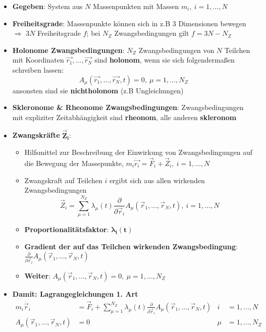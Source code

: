 \begin{itemize}
	\item \textbf{Gegeben}: System aus $N$ Massenpunkten mit Massen $m_i,\ i = 1, \dots, N$
	\item \textbf{Freiheitsgrade}: Massenpunkte können sich in z.B $3$ Dimensionen bewegen $\Rightarrow$ $3N$ Freiheitsgrade $f$; bei $N_Z$ Zwangsbedingungen gilt $f = 3N - N_Z$
	\item \textbf{Holonome Zwangsbedingungen}: $N_Z$ Zwangsbedingungen von $N$ Teilchen mit Koordinaten $\vec{r_1}, \dots, \vec{r_N}$ sind \textbf{holonom}, wenn sie sich folgendermaßen schreiben lassen: $$A_\mu(\vec{r_1}, \dots, \vec{r_N}, t) = 0,\ \mu = 1, \dots, N_Z$$ ansonsten sind sie \textbf{nichtholonom} (z.B Ungleichungen)
	\item \textbf{Skleronome \& Rheonome Zwangsbedingungen}: Zwangsbedingungen mit expliziter Zeitabhängigkeit sind \textbf{rheonom}, alle anderen \textbf{skleronom}
	\item \textbf{Zwangskräfte} $\mathbf{\vec{Z}_i}$:
	\begin{itemize}
		\item Hilfsmittel zur Beschreibung der Einwirkung von Zwangsbedingungen auf die Bewegung der Massepunkte, $m_i\ddot{\vec{r_i}} = \vec{F}_i + \vec{Z}_i,\ i= 1, \dots, N$
		\item Zwangskraft auf Teilchen $i$ ergibt sich aus allen wirkenden Zwangsbedingungen
		$$
			\vec{Z}_i = \sum^{N_Z}_{\mu=1}\lambda_\mu(t)\frac{\partial}{\partial\vec{r}_i}A_\mu(\vec{r}_1, \dots, \vec{r}_N, t),\ i = 1,\dots,N
		$$
		\item \textbf{Proportionalitätsfaktor}: $\mathbf{\lambda_i(t)}$
		\item \textbf{Gradient der auf das Teilchen wirkenden Zwangsbedingung}: $\frac{\partial}{\partial\vec{r}_i}A_\mu(\vec{r}_1, \dots, \vec{r}_N, t)$
		\item \textbf{Weiter}: $A_\mu(\vec{r}_1, \dots, \vec{r}_N, t) = 0,\ \mu = 1, \dots, N_Z$
	\end{itemize}
	\item \textbf{Damit: Lagrangegleichungen 1. Art}
	\begin{align*}
		m_i\ddot{\vec{r}_i} &= \vec{F}_i + \sum^{N_Z}_{\mu=1}\lambda_\mu(t)\frac{\partial}{\partial\vec{r}_i}A_\mu(\vec{r}_1, \dots, \vec{r}_N, t) &i &= 1,\dots,N\\
		A_\mu(\vec{r}_1, \dots, \vec{r}_N, t) &= 0 &\mu &= 1, \dots, N_Z
	\end{align*}
\end{itemize}


